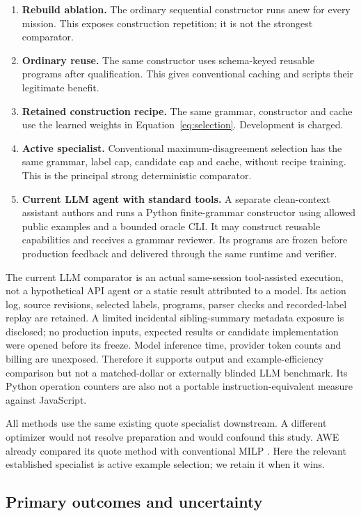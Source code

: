 \documentclass[11pt,letterpaper]{article}
\begin{document}
\begin{enumerate}
\item \textbf{Rebuild ablation.} The ordinary sequential constructor runs anew for every mission. This exposes construction repetition; it is not the strongest comparator.
\item \textbf{Ordinary reuse.} The same constructor uses schema-keyed reusable programs after qualification. This gives conventional caching and scripts their legitimate benefit.
\item \textbf{Retained construction recipe.} The same grammar, constructor and cache use the learned weights in Equation~\ref{eq:selection}. Development is charged.
\item \textbf{Active specialist.} Conventional maximum-disagreement selection has the same grammar, label cap, candidate cap and cache, without recipe training. This is the principal strong deterministic comparator.
\item \textbf{Current LLM agent with standard tools.} A separate clean-context assistant authors and runs a Python finite-grammar constructor using allowed public examples and a bounded oracle CLI. It may construct reusable capabilities and receives a grammar reviewer. Its programs are frozen before production feedback and delivered through the same runtime and verifier.
\end{enumerate}

The current LLM comparator is an actual same-session tool-assisted execution, not a hypothetical API agent or a static result attributed to a model. Its action log, source revisions, selected labels, programs, parser checks and recorded-label replay are retained. A limited incidental sibling-summary metadata exposure is disclosed; no production inputs, expected results or candidate implementation were opened before its freeze. Model inference time, provider token counts and billing are unexposed. Therefore it supports output and example-efficiency comparison but not a matched-dollar or externally blinded LLM benchmark. Its Python operation counters are also not a portable instruction-equivalent measure against JavaScript.

All methods use the same existing quote specialist downstream. A different optimizer would not resolve preparation and would confound this study. AWE already compared its quote method with conventional MILP \cite{awe}. Here the relevant established specialist is active example selection; we retain it when it wins.

\subsection{Primary outcomes and uncertainty}
\end{document}
